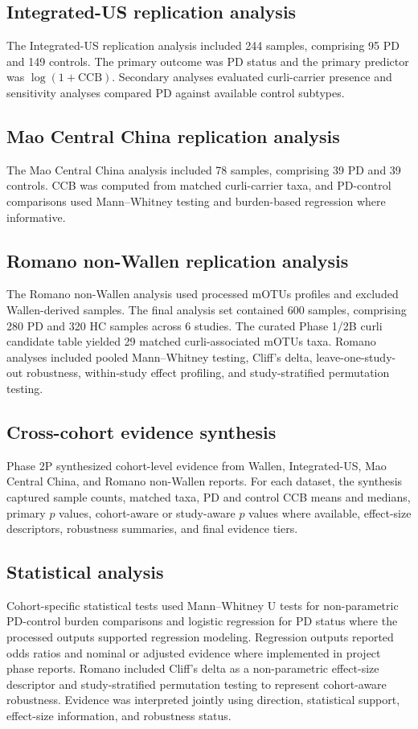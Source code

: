 \documentclass[12pt]{article}
\begin{document}
\subsection*{Integrated-US replication analysis}
The Integrated-US replication analysis included 244 samples, comprising 95 PD and 149 controls. The primary outcome was PD status and the primary predictor was $\log(1+\mathrm{CCB})$. Secondary analyses evaluated curli-carrier presence and sensitivity analyses compared PD against available control subtypes.

\subsection*{Mao Central China replication analysis}
The Mao Central China analysis included 78 samples, comprising 39 PD and 39 controls. CCB was computed from matched curli-carrier taxa, and PD-control comparisons used Mann--Whitney testing and burden-based regression where informative.

\subsection*{Romano non-Wallen replication analysis}
The Romano non-Wallen analysis used processed mOTUs profiles and excluded Wallen-derived samples. The final analysis set contained 600 samples, comprising 280 PD and 320 HC samples across 6 studies. The curated Phase 1/2B curli candidate table yielded 29 matched curli-associated mOTUs taxa. Romano analyses included pooled Mann--Whitney testing, Cliff's delta, leave-one-study-out robustness, within-study effect profiling, and study-stratified permutation testing.

\subsection*{Cross-cohort evidence synthesis}
Phase 2P synthesized cohort-level evidence from Wallen, Integrated-US, Mao Central China, and Romano non-Wallen reports. For each dataset, the synthesis captured sample counts, matched taxa, PD and control CCB means and medians, primary $p$ values, cohort-aware or study-aware $p$ values where available, effect-size descriptors, robustness summaries, and final evidence tiers.

\subsection*{Statistical analysis}
Cohort-specific statistical tests used Mann--Whitney U tests for non-parametric PD-control burden comparisons and logistic regression for PD status where the processed outputs supported regression modeling. Regression outputs reported odds ratios and nominal or adjusted evidence where implemented in project phase reports. Romano included Cliff's delta as a non-parametric effect-size descriptor and study-stratified permutation testing to represent cohort-aware robustness. Evidence was interpreted jointly using direction, statistical support, effect-size information, and robustness status.
\end{document}
